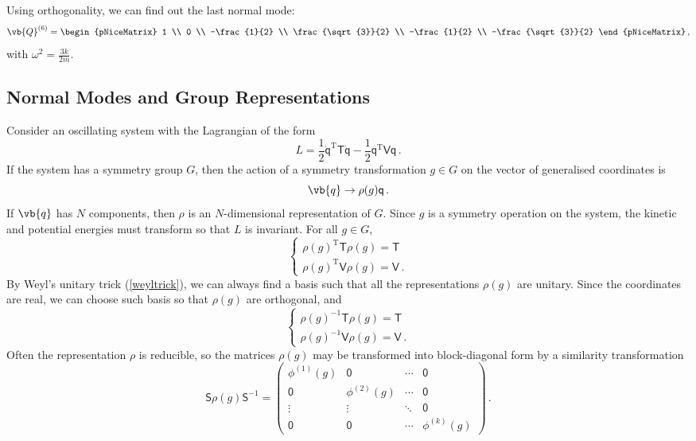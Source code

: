 \documentclass{article}
\theoremstyle{plain}\theoremheaderfont{\normalfont\itshape}\theorembodyfont{\rmfamily}\theoremseparator{.}\newtheorem*{rem}{Remark}\newtheorem*{ex}{Example}\newtheorem*{proof}{Proof}\newtheorem*{altp}{Alternative proof}
\theoremstyle{plain}\theoremheaderfont{\normalfont\bfseries}\theorembodyfont{\rmfamily}\theoremseparator{.}\newtheorem{thm}{Theorem}[section]\newtheorem{lem}[thm]{Lemma}\newtheorem{prop}[thm]{Proposition}\newtheorem*{cor}{Corollary}\newtheorem{defn}[thm]{Definition}\newtheorem{clm}[thm]{Claim}\newtheorem{clminproof}{Claim}
\theoremstyle{break}\theoremheaderfont{\normalfont\itshape}\theorembodyfont{\rmfamily}\theoremseparator{.\medskip}\newtheorem*{proofskip}{Proof}\newtheorem*{exs}{Examples}\newtheorem*{rems}{Remarks}
\theoremstyle{break}\theoremheaderfont{\normalfont\bfseries}\theorembodyfont{\rmfamily}\theoremseparator{.\medskip}\newtheorem{lemskip}[thm]{Lemma}\newtheorem{defnskip}[thm]{Definition}\newtheorem{propskip}[thm]{Proposition}\newtheorem{thmskip}[thm]{Theorem}
\numberwithin{equation}{section}
\newcommand{\tp}{^\mathrm{T}}
\begin{document}
	Using orthogonality, we can find out the last normal mode:
	\[\vb{Q}^{(6)}=\begin{pNiceMatrix}
		1 \\ 0 \\ -\frac{1}{2} \\ \frac{\sqrt{3}}{2} \\ -\frac{1}{2} \\ -\frac{\sqrt{3}}{2}
	\end{pNiceMatrix}\,,\]
	with \(\omega^2=\frac{3k}{2m}\).
	\subsection{Normal Modes and Group Representations}
	Consider an oscillating system with the Lagrangian of the form
	\[L=\frac{1}{2}\dot{\mathsf{q}}\tp\mathsf{T}\dot{\mathsf{q}}-\frac{1}{2}\mathsf{q}\tp\mathsf{Vq}\,.\]
	If the system has a symmetry group \(G\), then the action of a symmetry transformation \(g\in G\) on the vector of generalised coordinates is
	\[\vb{q}\to\rho(g)\mathsf{q}\,.\]
	If \(\vb{q}\) has \(N\) components, then \(\rho\) is an \(N\)-dimensional representation of \(G\). Since \(g\) is a symmetry operation on the system, the kinetic and potential energies must transform so that \(L\) is invariant. For all \(g\in G\),
	\[\begin{cases}
		\rho(g)\tp\mathsf{T}\rho(g)=\mathsf{T}\\
		\rho(g)\tp\mathsf{V}\rho(g)=\mathsf{V}\,.
	\end{cases}\]
	By Weyl's unitary trick (\cref{weyltrick}), we can always find a basis such that all the representations \(\rho(g)\) are unitary. Since the coordinates are real, we can choose such basis so that \(\rho(g)\) are orthogonal, and
	\begin{equation}\tag{\(\dagger\)}
		\begin{cases}
			\rho(g)^{-1}\mathsf{T}\rho(g)=\mathsf{T}\\
			\rho(g)^{-1}\mathsf{V}\rho(g)=\mathsf{V}\,.
		\end{cases}
	\end{equation}
	Often the representation \(\rho\) is reducible, so the matrices \(\rho(g)\) may be transformed into block-diagonal form by a similarity transformation
	\[\mathsf{S}\rho(g)\mathsf{S}^{-1}=\begin{pmatrix}
		\phi^{(1)}(g) & \mathsf{0} & \cdots & \mathsf{0}\\
		\mathsf{0} & \phi^{(2)}(g) & \cdots & \mathsf{0}\\
		\vdots & \vdots & \ddots & \mathsf{0}\\
		\mathsf{0} & \mathsf{0} & \cdots & \phi^{(k)}(g)
	\end{pmatrix}\,.\]
\end{document}
